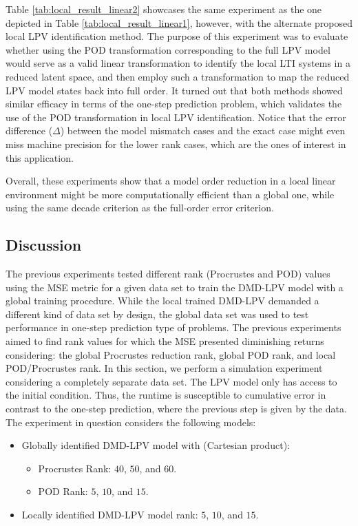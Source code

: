 Table \ref{tab:local_result_linear2} showcases the same experiment as the one depicted in Table \ref{tab:local_result_linear1}, however, with the alternate proposed local LPV identification method.
%
The purpose of this experiment was to evaluate whether using the POD transformation corresponding to the full LPV model would serve as a valid linear transformation to identify the local LTI systems in a reduced latent space, and then employ such a transformation to map the reduced LPV model states back into full order.
%
It turned out that both methods showed similar efficacy in terms of the one-step prediction problem, which validates the use of the POD transformation in local LPV identification.
%
Notice that the error difference ($\Delta$) between the model mismatch cases and the exact case might even miss machine precision for the lower rank cases, which are the ones of interest in this application.


Overall, these experiments show that a model order reduction in a local linear environment might be more computationally efficient than a global one, while using the same decade criterion as the full-order error criterion.


\subsection{Discussion} \label{sec:results_showcase}

The previous experiments tested different rank (Procrustes and POD) values using the MSE metric for a given data set to train the DMD-LPV model with a global training procedure.
%
While the local trained DMD-LPV demanded a different kind of data set by design, the global data set was used to test performance in one-step prediction type of problems. 
%
The previous experiments aimed to find rank values for which the MSE presented diminishing returns considering: the global Procrustes reduction rank, global POD rank, and local POD/Procrustes rank. 
%
In this section, we perform a simulation experiment considering a completely separate data set. The LPV model only has access to the initial condition. Thus, the runtime is susceptible to cumulative error in contrast to the one-step prediction, where the previous step is given by the data.
%
The experiment in question considers the following models:
\begin{itemize}
    \item Globally identified DMD-LPV model with (Cartesian product):
    \begin{itemize}
        \item Procrustes Rank: $40$, $50$, and $60$.
        \item POD Rank: $5$, $10$, and $15$.
    \end{itemize}
    \item Locally identified DMD-LPV model rank: $5$, $10$, and $15$.
\end{itemize}

